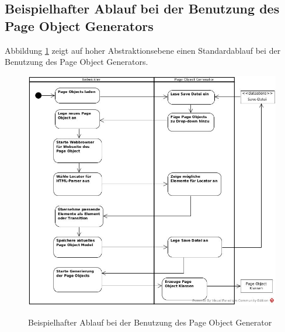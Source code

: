\subsection{Beispielhafter Ablauf bei der Benutzung des Page Object Generators}
\label{sec:moeglicher_ablauf_eines_standartanwendungsfall}

Abbildung \ref{fig:sequenz} zeigt auf hoher Abstraktionsebene einen Standardablauf bei der Benutzung des Page Object Generators.



\begin{figure}[htb]
  \centering  
  \includegraphics[scale=0.45]{img/Activitydiagram.jpg}\\
  \caption{Beispielhafter Ablauf bei der Benutzung des Page Object Generator}
  \label{fig:sequenz}
\end{figure}

